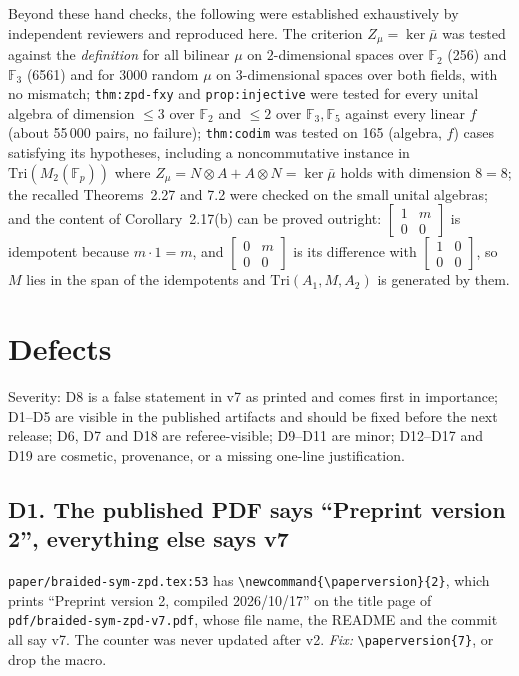 \documentclass[11pt,a4paper]{article}
\newcommand{\cpt}[1]{\texttt{#1}}          %
\begin{document}
\noindent
Beyond these hand checks, the following were established exhaustively by independent reviewers and
reproduced here. The criterion $Z_\mu=\ker\bar\mu$ was tested against the \emph{definition} for all
bilinear $\mu$ on $2$-dimensional spaces over $\mathbb{F}_2$ (256) and $\mathbb{F}_3$ (6561) and for 3000
random $\mu$ on $3$-dimensional spaces over both fields, with no mismatch; \cpt{thm:zpd-fxy} and
\cpt{prop:injective} were tested for every unital algebra of dimension $\le3$ over $\mathbb{F}_2$ and
$\le2$ over $\mathbb{F}_3,\mathbb{F}_5$ against every linear $f$ (about 55\,000 pairs, no failure);
\cpt{thm:codim} was tested on 165 (algebra, $f$) cases satisfying its hypotheses, including a
noncommutative instance in $\mathrm{Tri}(M_2(\mathbb{F}_p))$ where
$Z_\mu=N\otimes A+A\otimes N=\ker\bar\mu$ holds with dimension $8=8$; the recalled Theorems~2.27 and 7.2
were checked on the small unital algebras; and the content of Corollary~2.17(b) can be proved outright:
$\left[\begin{smallmatrix}1&m\\0&0\end{smallmatrix}\right]$ is idempotent because $m\cdot1=m$, and
$\left[\begin{smallmatrix}0&m\\0&0\end{smallmatrix}\right]$ is its difference with
$\left[\begin{smallmatrix}1&0\\0&0\end{smallmatrix}\right]$, so $M$ lies in the span of the idempotents
and $\mathrm{Tri}(A_1,M,A_2)$ is generated by them.

\section{Defects}
\label{sec:defects}

Severity: D8 is a false statement in v7 as printed and comes first in importance; D1--D5 are visible in
the published artifacts and should be fixed before the next release; D6, D7 and D18 are referee-visible;
D9--D11 are minor; D12--D17 and D19 are cosmetic, provenance, or a missing one-line justification.

\subsection*{D1. The published PDF says ``Preprint version 2'', everything else says v7}
\cpt{paper/braided-sym-zpd.tex:53} has \cpt{\textbackslash newcommand\{\textbackslash paperversion\}\{2\}},
which prints ``Preprint version 2, compiled 2026/10/17'' on the title page of
\cpt{pdf/braided-sym-zpd-v7.pdf}, whose file name, the README and the commit all say v7. The counter was
never updated after v2. \emph{Fix:} \cpt{\textbackslash paperversion\{7\}}, or drop the macro.
\end{document}

